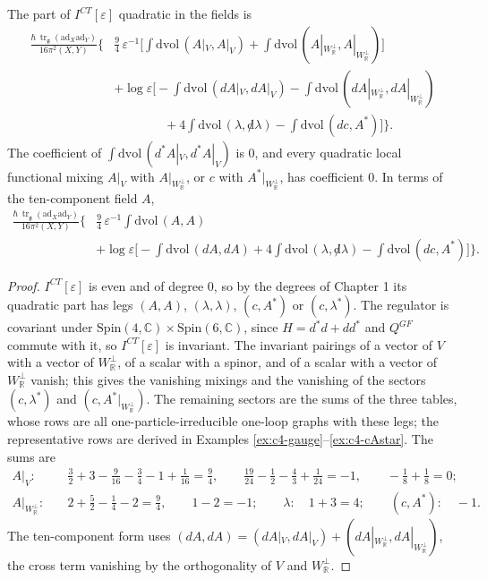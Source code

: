 \begin{theorem}
\label{thm:c4-quadratic}
The part of $I^{CT}[\varepsilon]$ quadratic in the fields is
\begin{equation}
\begin{aligned}
\frac{\hbar\,\operatorname{tr}_{\mathfrak g}(\mathrm{ad}_X\mathrm{ad}_Y)}{16\pi^2(X,Y)}\Big\{&\tfrac94\,\varepsilon^{-1}\Big[\int\mathrm{dvol}\,(A|_V,A|_V)+\int\mathrm{dvol}\,(A|_{W_{\mathbb R}^\perp},A|_{W_{\mathbb R}^\perp})\Big]\\
&+\log\varepsilon\Big[-\int\mathrm{dvol}\,(dA|_V,dA|_V)-\int\mathrm{dvol}\,(dA|_{W_{\mathbb R}^\perp},dA|_{W_{\mathbb R}^\perp})\\
&\qquad\qquad+4\int\mathrm{dvol}\,(\lambda,{\not d}\lambda)-\int\mathrm{dvol}\,(dc,A^*)\Big]\Big\}.
\end{aligned}
\label{eq:c4-quadratic}
\end{equation}
The coefficient of $\int\mathrm{dvol}\,(d^*A|_V,d^*A|_V)$ is $0$, and every quadratic local functional mixing $A|_V$ with $A|_{W_{\mathbb R}^\perp}$, or $c$ with $A^*|_{W_{\mathbb R}^\perp}$, has coefficient $0$. In terms of the ten-component field $A$,
\[
\begin{aligned}
\frac{\hbar\,\operatorname{tr}_{\mathfrak g}(\mathrm{ad}_X\mathrm{ad}_Y)}{16\pi^2(X,Y)}\Big\{&\tfrac94\,\varepsilon^{-1}\int\mathrm{dvol}\,(A,A)\\
&+\log\varepsilon\Big[-\int\mathrm{dvol}\,(dA,dA)+4\int\mathrm{dvol}\,(\lambda,{\not d}\lambda)-\int\mathrm{dvol}\,(dc,A^*)\Big]\Big\}.
\end{aligned}
\]
\end{theorem}

\begin{proof}
$I^{CT}[\varepsilon]$ is even and of degree $0$, so by the degrees of Chapter 1 its quadratic part has legs $(A,A)$, $(\lambda,\lambda)$, $(c,A^*)$ or $(c,\lambda^*)$. The regulator is covariant under $\mathrm{Spin}(4,\mathbb C)\times\mathrm{Spin}(6,\mathbb C)$, since $H=d^*d+dd^*$ and $Q^{GF}$ commute with it, so $I^{CT}[\varepsilon]$ is invariant. The invariant pairings of a vector of $V$ with a vector of $W_{\mathbb R}^\perp$, of a scalar with a spinor, and of a scalar with a vector of $W_{\mathbb R}^\perp$ vanish; this gives the vanishing mixings and the vanishing of the sectors $(c,\lambda^*)$ and $(c,A^*|_{W_{\mathbb R}^\perp})$. The remaining sectors are the sums of the three tables, whose rows are all one-particle-irreducible one-loop graphs with these legs; the representative rows are derived in Examples \ref{ex:c4-gauge}--\ref{ex:c4-cAstar}. The sums are
\[
\begin{aligned}
A|_V:&\quad \tfrac32+3-\tfrac9{16}-\tfrac34-1+\tfrac1{16}=\tfrac94,\qquad \tfrac{19}{24}-\tfrac12-\tfrac43+\tfrac1{24}=-1,\qquad -\tfrac18+\tfrac18=0;\\
A|_{W_{\mathbb R}^\perp}:&\quad 2+\tfrac52-\tfrac14-2=\tfrac94,\qquad 1-2=-1;\qquad \lambda:\quad 1+3=4;\qquad (c,A^*):\quad -1 .
\end{aligned}
\]
The ten-component form uses $(dA,dA)=(dA|_V,dA|_V)+(dA|_{W_{\mathbb R}^\perp},dA|_{W_{\mathbb R}^\perp})$, the cross term vanishing by the orthogonality of $V$ and $W_{\mathbb R}^\perp$.
\end{proof}

